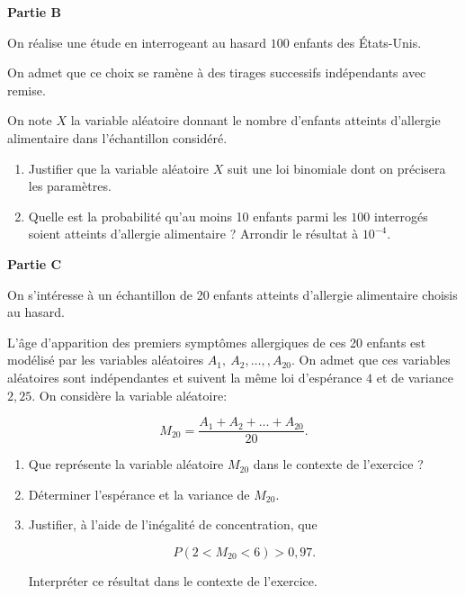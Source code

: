 \medskip

\textbf{Partie B}

\medskip

On réalise une étude en interrogeant au hasard $100$ enfants des États-Unis.

On admet que ce choix se ramène à des tirages successifs indépendants avec remise.

On note $X$ la variable aléatoire donnant le nombre d'enfants atteints d'allergie alimentaire dans l'échantillon considéré.

\medskip

\begin{enumerate}
\item Justifier que la variable aléatoire $X$ suit une loi binomiale dont on précisera les paramètres.
\item Quelle est la probabilité qu'au moins 10 enfants parmi les $100$ interrogés soient atteints d'allergie alimentaire ? Arrondir le résultat à $10^{-4}$.
\end{enumerate}

\medskip

\textbf{Partie C}

\medskip

On s'intéresse à un échantillon de 20 enfants atteints d'allergie alimentaire choisis au
hasard.

\smallskip

L'âge d'apparition des premiers symptômes allergiques de ces 20 enfants est modélisé par les variables aléatoires $A_1,\: A_2,\ldots, ,A_{20}$. On admet que ces variables aléatoires sont indépendantes et suivent la même loi d'espérance $4$ et de variance $2,25$.
On considère la variable aléatoire:

\[M_{20} = \dfrac{A_1 + A_2 + \ldots + A_{20}}{20}.\]


\begin{enumerate}
\item Que représente la variable aléatoire $M_{20}$ dans le contexte de l'exercice ?
\item Déterminer l'espérance et la variance de $M_{20}$.
\item Justifier, à l'aide de l'inégalité de concentration, que

\[P(2 < M_{20} < 6) > 0,97.\]

Interpréter ce résultat dans le contexte de l'exercice.
\end{enumerate}

\bigskip
